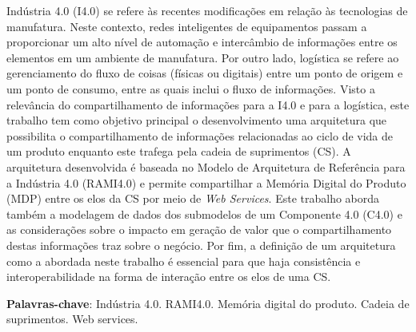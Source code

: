 \setlength{\absparsep}{18pt} %
\begin{resumo}
	Indústria 4.0 (I4.0) se refere às recentes modificações em relação às tecnologias de manufatura. Neste contexto, redes inteligentes de equipamentos passam a proporcionar um alto nível de automação e intercâmbio de informações entre os elementos em um ambiente de manufatura. Por outro lado, logística se refere ao gerenciamento do fluxo de coisas (físicas ou digitais) entre um ponto de origem e um ponto de consumo, entre as quais inclui o fluxo de informações. Visto a relevância do compartilhamento de informações para a I4.0 e para a logística, este trabalho tem como objetivo principal o desenvolvimento uma arquitetura que possibilita o compartilhamento de informações relacionadas ao ciclo de vida de um produto enquanto este trafega pela cadeia de suprimentos (CS). A arquitetura desenvolvida é baseada no Modelo de Arquitetura de Referência para a Indústria 4.0 (RAMI4.0) e permite compartilhar a Memória Digital do Produto (MDP) entre os elos da CS por meio de \textit{Web Services}. Este trabalho aborda também a modelagem de dados dos submodelos de um Componente 4.0 (C4.0) e as considerações sobre o impacto em geração de valor que o compartilhamento destas informações traz sobre o negócio. Por fim, a definição de um arquitetura como a abordada neste trabalho é essencial para que haja consistência e interoperabilidade na forma de interação entre os elos de uma CS.

	\vspace{\onelineskip}

	\noindent
	\textbf{Palavras-chave}: Indústria 4.0. RAMI4.0. Memória digital do produto. Cadeia de suprimentos. Web services.
\end{resumo}

